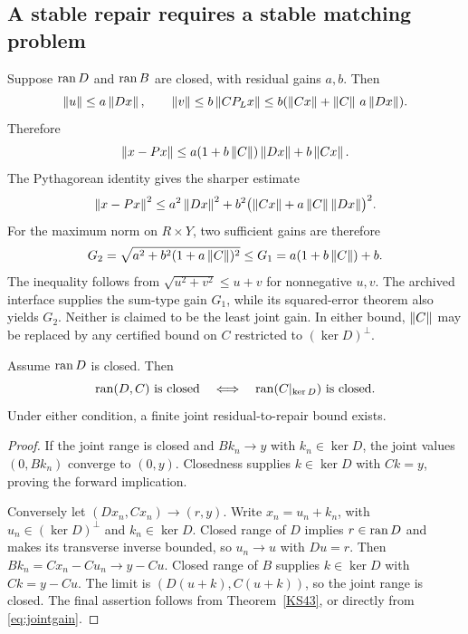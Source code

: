
\subsection{A stable repair requires a stable matching problem}
Suppose \(\operatorname{ran} D\) and \(\operatorname{ran} B\) are closed, with residual gains \(a,b\). Then
\[
 \left\lVert u\right\rVert\le a\left\lVert Dx\right\rVert,\qquad
 \left\lVert v\right\rVert\le b\left\lVert CP_Lx\right\rVert
 \le b(\left\lVert Cx\right\rVert+\left\lVert C\right\rVert\,a\left\lVert Dx\right\rVert).
\]
Therefore
\begin{equation}\label{eq:jointgain}
 \left\lVert x-Px\right\rVert\le
 a(1+b\left\lVert C\right\rVert)\left\lVert Dx\right\rVert+b\left\lVert Cx\right\rVert.
\end{equation}
The Pythagorean identity gives the sharper estimate
\[
 \left\lVert x-Px\right\rVert^2\le
 a^2\left\lVert Dx\right\rVert^2+b^2\bigl(\left\lVert Cx\right\rVert+a\left\lVert C\right\rVert\left\lVert Dx\right\rVert\bigr)^2.
\]
For the maximum norm on \(R\times Y\), two sufficient gains are therefore
\[
 G_2=\sqrt{a^2+b^2(1+a\left\lVert C\right\rVert)^2}
 \le G_1=a(1+b\left\lVert C\right\rVert)+b.
\]
The inequality follows from \(\sqrt{u^2+v^2}\le u+v\) for nonnegative \(u,v\). The archived interface supplies the sum-type gain \(G_1\), while its squared-error theorem also yields \(G_2\). Neither is claimed to be the least joint gain. In either bound, \(\left\lVert C\right\rVert\) may be replaced by any certified bound on \(C\) restricted to \((\ker D)^\perp\).

\begin{theorem}\label{KS47}
Assume \(\operatorname{ran} D\) is closed. Then
\[
 \operatorname{ran}(D,C)\text{ is closed}\quad\Longleftrightarrow\quad
 \operatorname{ran}(C|_{\ker D})\text{ is closed}.
\]
Under either condition, a finite joint residual-to-repair bound exists.
\end{theorem}
\begin{proof}
If the joint range is closed and \(Bk_n\to y\) with \(k_n\in\ker D\), the joint values \((0,Bk_n)\) converge to \((0,y)\). Closedness supplies \(k\in\ker D\) with \(Ck=y\), proving the forward implication.

Conversely let \((Dx_n,Cx_n)\to(r,y)\). Write \(x_n=u_n+k_n\), with \(u_n\in(\ker D)^\perp\) and \(k_n\in\ker D\). Closed range of \(D\) implies \(r\in\operatorname{ran} D\) and makes its transverse inverse bounded, so \(u_n\to u\) with \(Du=r\). Then \(Bk_n=Cx_n-Cu_n\to y-Cu\). Closed range of \(B\) supplies \(k\in\ker D\) with \(Ck=y-Cu\). The limit is \((D(u+k),C(u+k))\), so the joint range is closed. The final assertion follows from Theorem~\ref{KS43}, or directly from \eqref{eq:jointgain}.
\end{proof}



